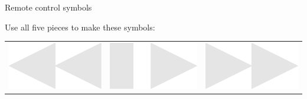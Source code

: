 \documentclass[14pt]{beamer}
\begin{document}
    \begin{frame}{Remote control symbols}
        \begin{center}
            Use all five pieces to make these symbols:

            \bigskip\bigskip

            \begin{tabular}{ccc}
                      \includegraphics[scale=0.2]{figures/figure026i.pdf} \quad&
                 \quad\includegraphics[scale=0.2]{figures/figure026j.pdf} \quad&
                 \quad\includegraphics[scale=0.2]{figures/figure026k.pdf} \\

\end{tabular}
\end{center}
\end{frame}
\end{document}
